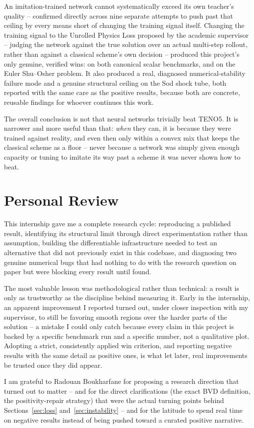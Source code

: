 \documentclass[11pt]{article}
\begin{document}
An imitation-trained network cannot systematically exceed its own
teacher's quality -- confirmed directly across nine separate attempts to
push past that ceiling by every means short of changing the training
signal itself. Changing the training signal to the Unrolled Physics Loss
proposed by the academic supervisor -- judging the network against the
true solution over an actual multi-step rollout, rather than against a
classical scheme's own decision -- produced this project's only genuine,
verified wins: on both canonical scalar benchmarks, and on the Euler
Shu--Osher problem. It also produced a real, diagnosed numerical-stability
failure mode and a genuine structural ceiling on the Sod shock tube, both
reported with the same care as the positive results, because both are
concrete, reusable findings for whoever continues this work.

The overall conclusion is not that neural networks trivially beat TENO5.
It is narrower and more useful than that: \emph{when} they can, it is
because they were trained against reality, and even then only within a
convex mix that keeps the classical scheme as a floor -- never because a
network was simply given enough capacity or tuning to imitate its way past
a scheme it was never shown how to beat.

\section{Personal Review}

This internship gave me a complete research cycle: reproducing a published
result, identifying its structural limit through direct experimentation
rather than assumption, building the differentiable infrastructure needed
to test an alternative that did not previously exist in this codebase, and
diagnosing two genuine numerical bugs that had nothing to do with the
research question on paper but were blocking every result until found.

The most valuable lesson was methodological rather than technical: a
result is only as trustworthy as the discipline behind measuring it. Early
in the internship, an apparent improvement I reported turned out, under
closer inspection with my supervisor, to still be favoring smooth regions
over the harder parts of the solution -- a mistake I could only catch
because every claim in this project is backed by a specific benchmark run
and a specific number, not a qualitative plot. Adopting a strict,
consistently applied win criterion, and reporting negative results with
the same detail as positive ones, is what let later, real improvements be
trusted once they did appear.

I am grateful to Radouan Boukharfane for proposing a research direction
that turned out to matter -- and for the direct clarifications (the exact
BVD definition, the positivity-repair strategy) that were the actual
turning points behind Sections~\ref{sec:loss} and~\ref{sec:instability} --
and for the latitude to spend real time on negative results instead of
being pushed toward a curated positive narrative.
\end{document}
